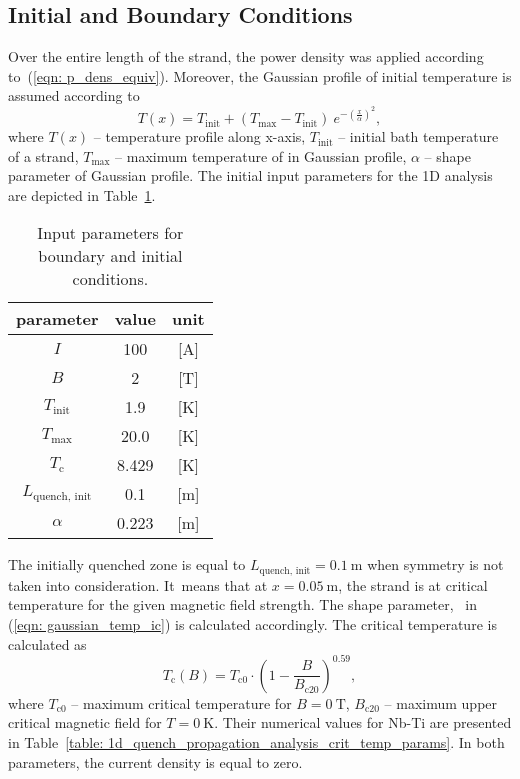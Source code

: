 \subsection{Initial and Boundary Conditions}

Over the entire length of the strand, the power density was applied according to~(\ref{eqn: p_dens_equiv}). Moreover, the Gaussian profile of initial temperature is assumed according to 
\begin{equation}
    T(x) = T_\text{init} + (T_\text{max} - T_\text{init}) ~ e^{-(\frac{x}{\alpha})^2},
    \label{eqn: gaussian_temp_ic}
\end{equation}
where $T(x)$ -- temperature profile along x-axis, $T_\text{init}$ -- initial bath temperature of a strand, $T_\text{max}$ -- maximum temperature of in Gaussian profile, $\alpha$ -- shape parameter of Gaussian profile. The initial input parameters for the 1D analysis are depicted in Table~\ref{table: 1d_quench_propagation_analysis_init_temp_input_parameters}. 

\begin{table}[H]
    \caption{Input parameters for boundary and initial conditions.} 
    \vspace{-1.em} 
    \fontsize{10}{10}
    \selectfont 
    \renewcommand{\arraystretch}{1.5}
    \begin{center}
        \begin{tabular}{ ccc }  
        \hline
        parameter & value & unit \\
        \hline
        $I$ & 100 & [A] \\
        $B$ & 2 & [T] \\
        $T_\text{init}$ & 1.9 & [K] \\
        $T_\text{max}$ & 20.0 & [K] \\
        $T_\text{c}$ & 8.429 & [K] \\
        $L_\text{quench, init}$ & 0.1 & [m] \\ 
        $\alpha$ & 0.223 & [m] \\   
        \hline 
        \end{tabular}
    \end{center}  
     \label{table: 1d_quench_propagation_analysis_init_temp_input_parameters} 
 \end{table}

The initially quenched zone is equal to $L_\text{quench, init}= 0.1~\text{m}$ when symmetry is not taken into consideration. It~means that at $x=0.05~\text{m}$, the strand is at critical temperature for the given magnetic field strength. The shape parameter, \textalpha~in (\ref{eqn: gaussian_temp_ic}) is calculated accordingly. The critical temperature is calculated as
\begin{equation}
    T_\text{c}(B) = T_\text{c0}\cdot(1-\frac{B}{B_\text{c20}})^{0.59},
\end{equation}
where $T_\text{c0}$ -- maximum critical temperature for $B=0~\text{T}$, $B_\text{c20}$ -- maximum upper critical magnetic field for $T=0~\text{K}$. Their numerical values for Nb-Ti are presented in Table~\ref{table: 1d_quench_propagation_analysis_crit_temp_params}. In both parameters, the current density is equal to zero. 

